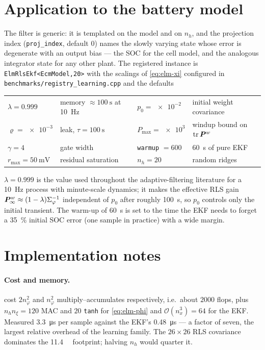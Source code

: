 \section{Application to the battery model}
The filter is generic: it is templated on the model and on $n_h$, and the projection index
(\texttt{proj\_index}, default $0$) names the slowly varying state whose error is degenerate with
an output bias --- the SOC for the cell model, and the analogous integrator state for any other
plant.  The registered instance is \texttt{ElmRlsEkf<EcmModel,20>} with the scalings of
\cref{eq:elm-xi} configured in \texttt{benchmarks/registry\_learning.cpp} and the defaults
\begin{center}
\begin{tabular}{@{}llll@{}}
\toprule
$\lambda = 0.999$ & memory $\approx\SI{100}{\second}$ at \SI{10}{\hertz} &
$p_0 = \num{e-2}$ & initial weight covariance \\
$\varrho = \num{e-3}$ & leak, $\tau = \SI{100}{\second}$ &
$P_{\max} = \num{e3}$ & windup bound on $\operatorname{tr}\bm{P}^w$ \\
$\gamma = 4$ & gate width & \texttt{warmup} $= 600$ & \SI{60}{\second} of pure EKF \\
$r_{\max} = \SI{50}{\milli\volt}$ & residual saturation &
$n_h = 20$ & random ridges \\
\bottomrule
\end{tabular}
\end{center}
$\lambda = 0.999$ is the value used throughout the adaptive-filtering literature for a
\SI{10}{\hertz} process with minute-scale dynamics; it makes the effective RLS gain
$\bm{P}^w_\infty \approx (1-\lambda)\Sigma_\varphi^{-1}$ independent of $p_0$ after roughly
\SI{100}{\second}, so $p_0$ controls only the initial transient.  The warm-up of \SI{60}{\second}
is set to the time the EKF needs to forget a \SI{35}{\percent} initial SOC error (one sample in
practice) with a wide margin.

\section{Implementation notes}
\paragraph{Cost and memory.}   cost $2n_\varphi^2$ and $n_\varphi^2$
multiply--accumulates respectively, i.e.\ about $\num{2000}$ flops, plus $n_h n_\xi = 120$ MAC and
$20$ \texttt{tanh} for \cref{eq:elm-phi} and $\mathcal{O}(n_x^3)=64$ for the EKF.  Measured
\SI{3.3}{\micro\second} per sample against the EKF's \SI{0.48}{\micro\second} --- a factor of
seven, the largest relative overhead of the learning family.  The $26\times26$ RLS covariance
dominates the \SI{11.4}{\kilo\byte} footprint; halving $n_h$ would quarter it.

